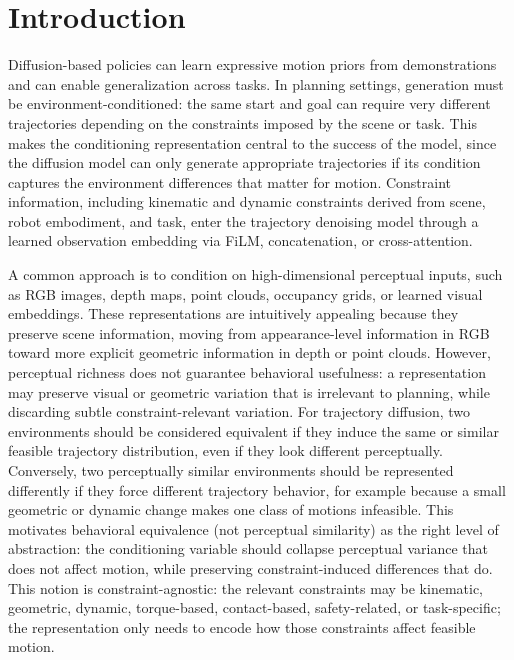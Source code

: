 \section{Introduction}\label{sec:introduction}

Diffusion-based policies can learn expressive motion priors from demonstrations and can enable generalization across tasks.
In planning settings, generation must be environment-conditioned: the same start and goal can require very different trajectories depending on the constraints imposed by the scene or task.
This makes the conditioning representation central to the success of the model, since the diffusion model can only generate appropriate trajectories if its condition captures the environment differences that matter for motion.
Constraint information, including kinematic and dynamic constraints derived from scene, robot embodiment, and task, enter the trajectory denoising model through a learned observation embedding via FiLM, concatenation, or cross-attention.

A common approach is to condition on high-dimensional perceptual inputs, such as RGB images, depth maps, point clouds, occupancy grids, or learned visual embeddings.
These representations are intuitively appealing because they preserve scene information, moving from appearance-level information in RGB toward more explicit geometric information in depth or point clouds.
However, perceptual richness does not guarantee behavioral usefulness: a representation may preserve visual or geometric variation that is irrelevant to planning, while discarding subtle constraint-relevant variation.
For trajectory diffusion, two environments should be considered equivalent if they induce the same or similar feasible trajectory distribution, even if they look different perceptually.
Conversely, two perceptually similar environments should be represented differently if they force different trajectory behavior, for example because a small geometric or dynamic change makes one class of motions infeasible.
This motivates behavioral equivalence (not perceptual similarity) as the right level of abstraction: the conditioning variable should collapse perceptual variance that does not affect motion, while preserving constraint-induced differences that do.
This notion is constraint-agnostic: the relevant constraints may be kinematic, geometric, dynamic, torque-based, contact-based, safety-related, or task-specific; the representation only needs to encode how those constraints affect feasible motion.
